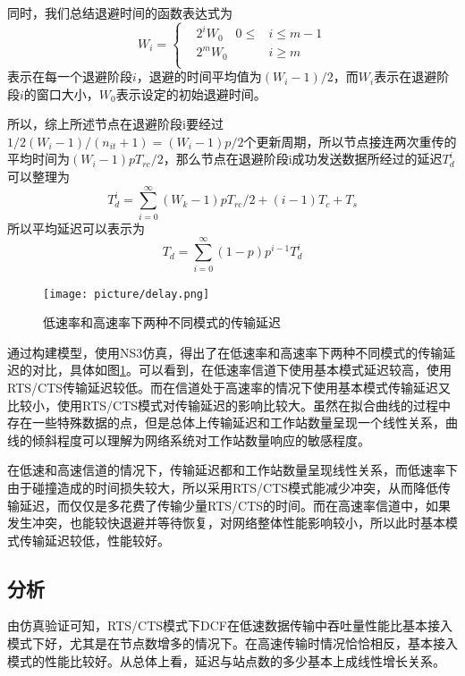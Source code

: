 \documentclass{article}
\begin{document}
同时，我们总结退避时间的函数表达式为
\begin{equation}
W_{i}=
\left\{
\begin{aligned}
&2^iW_{0}\quad 
0\leqslant &i\leqslant m-1\\
&2^mW_{0}\quad 			  &i\geqslant m\\
\end{aligned}
\right.
\end{equation}
表示在每一个退避阶段$i$，退避的时间平均值为$(W_{i}-1)/2$，而$W_{i}$表示在退避阶段$i$的窗口大小，$W_{0}$表示设定的初始退避时间。

所以，综上所述节点在退避阶段i要经过$1/2(W_{i}-1)/(n_{it}+1)=(W_{i}-1)p/2$个更新周期，所以节点接连两次重传的平均时间为$(W_{i}-1)pT_{rc}/2$，那么节点在退避阶段i成功发送数据所经过的延迟$T_{d}^{i}$可以整理为
\begin{equation}
T_{d}^{i}=\sum_{i=0}^{\infty}(W_{k}-1)pT_{rc}/2+(i-1)T_{c}+T_{s}
\end{equation}
所以平均延迟可以表示为
\begin{equation}
T_{d}=\sum_{i=0}^{\infty}(1-p)p^{i-1}T_{d}^{i}
\end{equation}

\begin{figure}[ht]
	\centering
	\texttt{[image: picture/delay.png]}
	\caption{低速率和高速率下两种不同模式的传输延迟}
	\label{fig:delay}
\end{figure}
通过构建模型，使用NS3仿真，得出了在低速率和高速率下两种不同模式的传输延迟的对比，具体如图\ref{fig:delay}。可以看到，在低速率信道下使用基本模式延迟较高，使用RTS/CTS传输延迟较低。而在信道处于高速率的情况下使用基本模式传输延迟又比较小，使用RTS/CTS模式对传输延迟的影响比较大。虽然在拟合曲线的过程中存在一些特殊数据的点，但是总体上传输延迟和工作站数量呈现一个线性关系，曲线的倾斜程度可以理解为网络系统对工作站数量响应的敏感程度。

在低速和高速信道的情况下，传输延迟都和工作站数量呈现线性关系，而低速率下由于碰撞造成的时间损失较大，所以采用RTS/CTS模式能减少冲突，从而降低传输延迟，而仅仅是多花费了传输少量RTS/CTS的时间。而在高速率信道中，如果发生冲突，也能较快退避并等待恢复，对网络整体性能影响较小，所以此时基本模式传输延迟较低，性能较好。
\subsection{分析}

由仿真验证可知，RTS/CTS模式下DCF在低速数据传输中吞吐量性能比基本接入模式下好，尤其是在节点数增多的情况下。在高速传输时情况恰恰相反，基本接入模式的性能比较好。从总体上看，延迟与站点数的多少基本上成线性增长关系。
\end{document}
